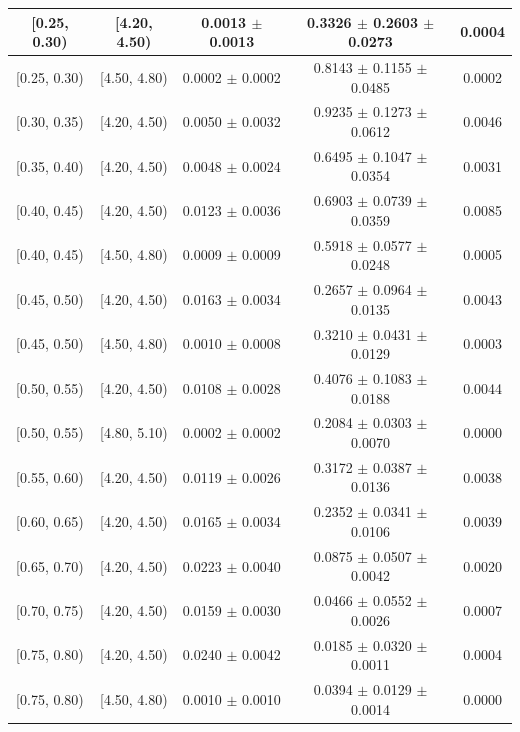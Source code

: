 \begin{longtable}{|c|c|c|c|c|}
\hline
\endlastfoot
[0.25, 0.30) & [4.20, 4.50) & 0.0013 $\pm$ 0.0013 & 0.3326 $\pm$ 0.2603 $\pm$ 0.0273 & 0.0004 \\ 
\hline
[0.25, 0.30) & [4.50, 4.80) & 0.0002 $\pm$ 0.0002 & 0.8143 $\pm$ 0.1155 $\pm$ 0.0485 & 0.0002 \\ 
\hline
[0.30, 0.35) & [4.20, 4.50) & 0.0050 $\pm$ 0.0032 & 0.9235 $\pm$ 0.1273 $\pm$ 0.0612 & 0.0046 \\ 
\hline
[0.35, 0.40) & [4.20, 4.50) & 0.0048 $\pm$ 0.0024 & 0.6495 $\pm$ 0.1047 $\pm$ 0.0354 & 0.0031 \\ 
\hline
[0.40, 0.45) & [4.20, 4.50) & 0.0123 $\pm$ 0.0036 & 0.6903 $\pm$ 0.0739 $\pm$ 0.0359 & 0.0085 \\ 
\hline
[0.40, 0.45) & [4.50, 4.80) & 0.0009 $\pm$ 0.0009 & 0.5918 $\pm$ 0.0577 $\pm$ 0.0248 & 0.0005 \\ 
\hline
[0.45, 0.50) & [4.20, 4.50) & 0.0163 $\pm$ 0.0034 & 0.2657 $\pm$ 0.0964 $\pm$ 0.0135 & 0.0043 \\ 
\hline
[0.45, 0.50) & [4.50, 4.80) & 0.0010 $\pm$ 0.0008 & 0.3210 $\pm$ 0.0431 $\pm$ 0.0129 & 0.0003 \\ 
\hline
[0.50, 0.55) & [4.20, 4.50) & 0.0108 $\pm$ 0.0028 & 0.4076 $\pm$ 0.1083 $\pm$ 0.0188 & 0.0044 \\ 
\hline
[0.50, 0.55) & [4.80, 5.10) & 0.0002 $\pm$ 0.0002 & 0.2084 $\pm$ 0.0303 $\pm$ 0.0070 & 0.0000 \\ 
\hline
[0.55, 0.60) & [4.20, 4.50) & 0.0119 $\pm$ 0.0026 & 0.3172 $\pm$ 0.0387 $\pm$ 0.0136 & 0.0038 \\ 
\hline
[0.60, 0.65) & [4.20, 4.50) & 0.0165 $\pm$ 0.0034 & 0.2352 $\pm$ 0.0341 $\pm$ 0.0106 & 0.0039 \\ 
\hline
[0.65, 0.70) & [4.20, 4.50) & 0.0223 $\pm$ 0.0040 & 0.0875 $\pm$ 0.0507 $\pm$ 0.0042 & 0.0020 \\ 
\hline
[0.70, 0.75) & [4.20, 4.50) & 0.0159 $\pm$ 0.0030 & 0.0466 $\pm$ 0.0552 $\pm$ 0.0026 & 0.0007 \\ 
\hline
[0.75, 0.80) & [4.20, 4.50) & 0.0240 $\pm$ 0.0042 & 0.0185 $\pm$ 0.0320 $\pm$ 0.0011 & 0.0004 \\ 
\hline
[0.75, 0.80) & [4.50, 4.80) & 0.0010 $\pm$ 0.0010 & 0.0394 $\pm$ 0.0129 $\pm$ 0.0014 & 0.0000 \\ 
\hline
\end{longtable}
